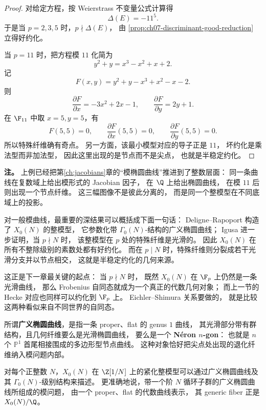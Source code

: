 \begin{proof}
对给定方程，按 Weierstrass 不变量公式计算得
\[
  \Delta(E)=-11^5.
\]
于是当 $p=2,3,5$ 时，$p\nmid\Delta(E)$，
由 \cref{prop:ch07-discriminant-good-reduction} 立得好约化。

当 $p=11$ 时，把方程模 $11$ 化简为
\[
  y^2+y=x^3-x^2+x+2.
\]
记
\[
  F(x,y)=y^2+y-x^3+x^2-x-2.
\]
则
\[
  \frac{\partial F}{\partial x}=-3x^2+2x-1,
  \qquad
  \frac{\partial F}{\partial y}=2y+1.
\]
在 $\F_{11}$ 中取 $x=5,y=5$，有
\[
  F(5,5)=0,
  \qquad
  \frac{\partial F}{\partial x}(5,5)=0,
  \qquad
  \frac{\partial F}{\partial y}(5,5)=0.
\]
所以特殊纤维确有奇点。
另一方面，该最小模型对应的导子正是 $11$，
坏约化是乘法型而非加法型，
因此这里出现的是节点而不是尖点，
也就是半稳定约化。
\end{proof}

\textbf{注。}
上例已经把第\ref{ch:jacobians}章的“模椭圆曲线”推进到了整数层面：
同一条曲线在复数域上给出模形式的 Jacobian 因子，
在 $\Q$ 上给出椭圆曲线，
在模 $11$ 后则出现一个节点纤维。
这三幅图像不是彼此分离的，
而是同一个整模型在不同底域上的投影。

对一般模曲线，最重要的深结果可以概括成下面一句话：
Deligne--Rapoport 构造了 $X_0(N)$ 的整模型，
它参数化带 $\Gamma_0(N)$-结构的广义椭圆曲线；
Igusa 进一步证明，当 $p\nmid N$ 时，
该整模型在 $p$ 处的特殊纤维是光滑的。
因此 $X_0(N)$ 在所有不整除级别的素数处都有好约化。
而在 $p\mid N$ 时，特殊纤维则分裂成若干光滑分支并以节点相交，
这就是半稳定约化的几何来源。

这正是下一章最关键的起点：
当 $p\nmid N$ 时，
既然 $X_0(N)$ 在 $\F_p$ 上仍然是一条光滑曲线，
那么 Frobenius 自同态就成为一个真正的代数几何对象；
而上一节的 Hecke 对应也同样可以约化到 $\F_p$ 上。
Eichler--Shimura 关系要做的，
就是比较这两种看似来自不同世界的自同态。

\begin{definition}
\label{def:generalized-elliptic-curve}
所谓\textbf{广义椭圆曲线}，是指一条 proper、flat 的 genus $1$ 曲线，
其光滑部分带有群结构，且几何纤维要么是光滑椭圆曲线，
要么是一个 \textbf{N\'eron $n$-gon}：
也就是 $n$ 个 $\mathbb P^1$ 首尾相接围成的多边形型节点曲线。
这种对象恰好把尖点处出现的退化纤维纳入模问题内部。
\end{definition}

\begin{theorem}
\label{thm:katz-mazur-x0n}
对每个正整数 $N$，$X_0(N)$ 在 $\Z[1/N]$ 上的紧化整模型可以通过广义椭圆曲线及其 $\Gamma_0(N)$-级别结构来描述。
更准确地说，带一个阶 $N$ 循环子群的广义椭圆曲线所组成的模问题，
由一个 proper、flat 的代数曲线表示，
其 generic fiber 正是 $X_0(N)/\Q$。
\end{theorem}

